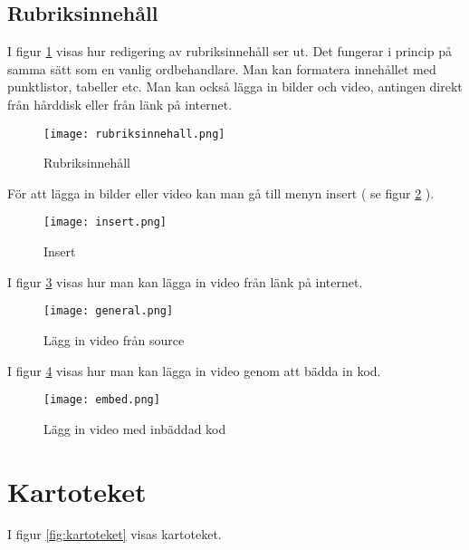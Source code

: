 \documentclass[12pt]{amsart}
\begin{document}
\subsection{Rubriksinnehåll}


I figur \ref{fig:rubriksinnehall} visas hur redigering av rubriksinnehåll ser ut. Det fungerar i princip på samma sätt som en vanlig ordbehandlare. Man kan formatera innehållet med punktlistor, tabeller etc. Man kan också lägga in bilder och video, antingen direkt från hårddisk eller från länk på internet.

\begin{figure}[H]
	\begin{center}
	\texttt{[image: rubriksinnehall.png]}
	\caption{Rubriksinnehåll}
	\label{fig:rubriksinnehall}
	\end{center}
\end{figure}

För att lägga in bilder eller video kan man gå till menyn insert ( se figur \ref{fig:insert} ).

\begin{figure}[H]
	\begin{center}
	\texttt{[image: insert.png]}
	\caption{Insert}
	\label{fig:insert}
	\end{center}
\end{figure}

I figur \ref{fig:general} visas hur man kan lägga in video från länk på internet.

\begin{figure}[H]
	\begin{center}
	\texttt{[image: general.png]}
	\caption{Lägg in video från source}
	\label{fig:general}
	\end{center}
\end{figure}

I figur \ref{fig:embed} visas hur man kan lägga in video genom att bädda in kod.

\begin{figure}[H]
	\begin{center}
	\texttt{[image: embed.png]}
	\caption{Lägg in video med inbäddad kod}
	\label{fig:embed}
	\end{center}
\end{figure}

\section{Kartoteket}
I figur \ref{fig:kartoteket} visas kartoteket.
\end{document}
